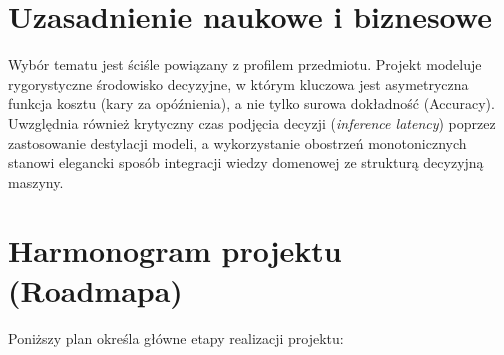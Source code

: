 \documentclass[12pt, a4paper]{article}
\begin{document}
\section{Uzasadnienie naukowe i biznesowe}
Wybór tematu jest ściśle powiązany z profilem przedmiotu. Projekt modeluje rygorystyczne środowisko decyzyjne, w którym kluczowa jest asymetryczna funkcja kosztu (kary za opóźnienia), a nie tylko surowa dokładność (Accuracy). Uwzględnia również krytyczny czas podjęcia decyzji (\textit{inference latency}) poprzez zastosowanie destylacji modeli, a wykorzystanie obostrzeń monotonicznych stanowi elegancki sposób integracji wiedzy domenowej ze strukturą decyzyjną maszyny.

\section{Harmonogram projektu (Roadmapa)}
Poniższy plan określa główne etapy realizacji projektu:
\end{document}
